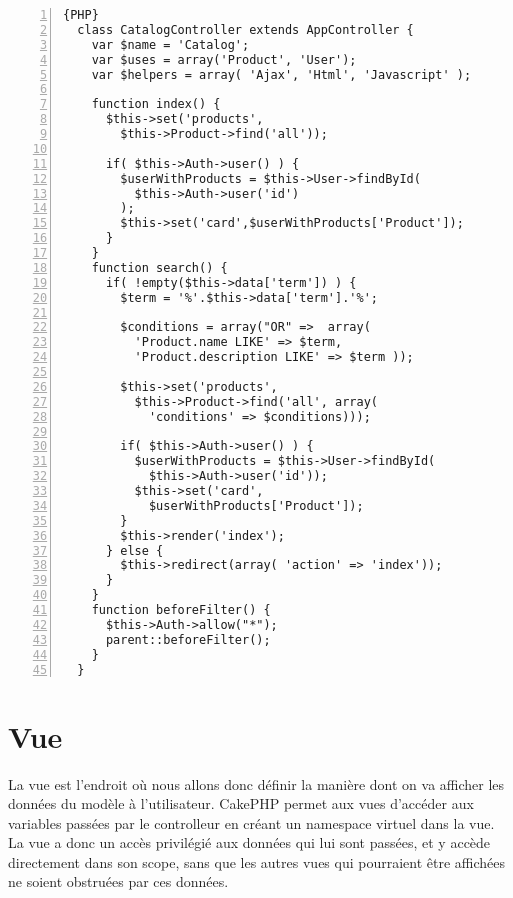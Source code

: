 \documentclass[12pt]{article}
\begin{document}
    \begin{lstlisting}[numbers=left,firstnumber=1,numbersep=-8pt,caption=Exemple controlleur]{PHP}
  class CatalogController extends AppController {
    var $name = 'Catalog';
    var $uses = array('Product', 'User');
    var $helpers = array( 'Ajax', 'Html', 'Javascript' );

    function index() {
      $this->set('products', 
        $this->Product->find('all'));
        
      if( $this->Auth->user() ) {
        $userWithProducts = $this->User->findById(
          $this->Auth->user('id')
        );
        $this->set('card',$userWithProducts['Product']);
      }
    }
    function search() {
      if( !empty($this->data['term']) ) {
        $term = '%'.$this->data['term'].'%';

        $conditions = array("OR" =>  array( 
          'Product.name LIKE' => $term, 
          'Product.description LIKE' => $term ));
          
        $this->set('products', 
          $this->Product->find('all', array(
            'conditions' => $conditions)));
            
        if( $this->Auth->user() ) {
          $userWithProducts = $this->User->findById(
            $this->Auth->user('id'));
          $this->set('card', 
            $userWithProducts['Product']);
        }
        $this->render('index');
      } else {
        $this->redirect(array( 'action' => 'index'));
      }
    }
    function beforeFilter() {
      $this->Auth->allow("*");
      parent::beforeFilter();
    }
  }
    \end{lstlisting}
  \section{Vue}
    La vue est l'endroit où nous allons donc définir la manière dont on va afficher les données du modèle à l'utilisateur. CakePHP permet aux vues d'accéder aux variables passées par le controlleur en créant un namespace virtuel dans la vue. La vue a donc un accès privilégié aux données qui lui sont passées, et y accède directement dans son scope, sans que les autres vues qui pourraient être affichées ne soient obstruées par ces données.
    
\end{document}
